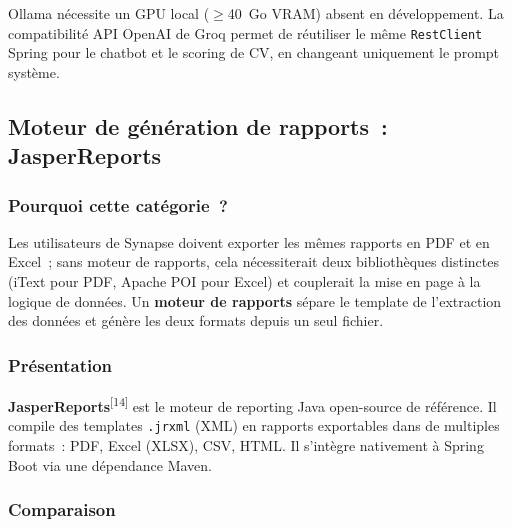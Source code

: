 Ollama nécessite un GPU local ($\geq$40~Go VRAM) absent en développement. La compatibilité API OpenAI de Groq permet de réutiliser le même \texttt{RestClient} Spring pour le chatbot et le scoring de CV, en changeant uniquement le prompt système.

\subsection{Moteur de génération de rapports~: JasperReports}

\subsubsection*{Pourquoi cette catégorie~?}

Les utilisateurs de Synapse doivent exporter les mêmes rapports en PDF et en Excel~; sans moteur de rapports, cela nécessiterait deux bibliothèques distinctes (iText pour PDF, Apache POI pour Excel) et couplerait la mise en page à la logique de données. Un \textbf{moteur de rapports} sépare le template de l'extraction des données et génère les deux formats depuis un seul fichier.

\subsubsection*{Présentation}

\textbf{JasperReports}\textsuperscript{[14]} est le moteur de reporting Java open-source de référence. Il
compile des templates \texttt{.jrxml} (XML) en rapports exportables dans de
multiples formats~: PDF, Excel (XLSX), CSV, HTML. Il s'intègre nativement à Spring
Boot via une dépendance Maven.

\subsubsection*{Comparaison}

